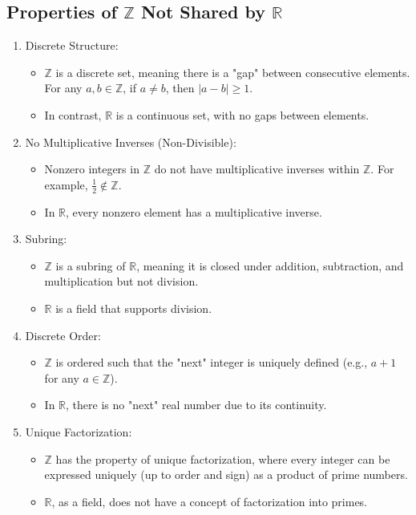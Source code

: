 \subsection{Properties of \( \mathbb{Z} \) Not Shared by \( \mathbb{R} \)}
\begin{enumerate}[topsep=0pt]
    \item Discrete Structure:
        \begin{itemize}
            \item \( \mathbb{Z} \) is a discrete set, meaning there is a "gap" between consecutive elements. For any \( a, b \in \mathbb{Z} \), if \( a \neq b \), then \( |a - b| \geq 1 \).
            \item In contrast, \( \mathbb{R} \) is a continuous set, with no gaps between elements.
        \end{itemize}
        
    \item No Multiplicative Inverses (Non-Divisible):
        \begin{itemize}
            \item Nonzero integers in \( \mathbb{Z} \) do not have multiplicative inverses within \( \mathbb{Z} \). For example, \( \frac{1}{2} \notin \mathbb{Z} \).
            \item In \( \mathbb{R} \), every nonzero element has a multiplicative inverse.
        \end{itemize}

    \item Subring:
     \begin{itemize}
        \item \( \mathbb{Z} \) is a subring of \( \mathbb{R} \), meaning it is closed under addition, subtraction, and multiplication but not division.
        \item \( \mathbb{R} \) is a field that supports division.
    \end{itemize}

    \item Discrete Order:
     \begin{itemize}
        \item \( \mathbb{Z} \) is ordered such that the "next" integer is uniquely defined (e.g., \( a+1 \) for any \( a \in \mathbb{Z} \)).
        \item In \( \mathbb{R} \), there is no "next" real number due to its continuity.
    \end{itemize}

    \item Unique Factorization:
     \begin{itemize}
        \item \( \mathbb{Z} \) has the property of unique factorization, where every integer can be expressed uniquely (up to order and sign) as a product of prime numbers.
        \item \( \mathbb{R} \), as a field, does not have a concept of factorization into primes.
    \end{itemize}
\end{enumerate}

